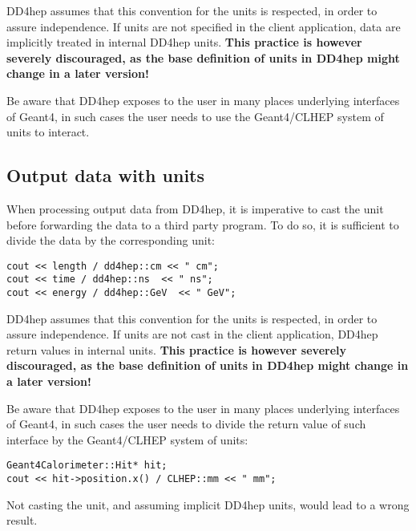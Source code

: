 DD4hep assumes that this convention for the units is respected, in order to assure independence. If units are not specified in the client application, data are implicitly treated in internal DD4hep units. \textbf{This practice is however severely discouraged, as the base definition of units in DD4hep might change in a later version!}

Be aware that DD4hep exposes to the user in many places underlying interfaces of Geant4, in such cases the user needs to use the Geant4/CLHEP system of units to interact.

\subsection{Output data with units}
When processing output data from DD4hep, it is imperative to cast the unit before forwarding the data to a third party program. To do so, it is sufficient to divide the data by the corresponding unit:
\begin{verbatim}
cout << length / dd4hep::cm << " cm";
cout << time / dd4hep::ns  << " ns";
cout << energy / dd4hep::GeV  << " GeV";
\end{verbatim}

DD4hep assumes that this convention for the units is respected, in order to assure independence. If units are not cast in the client application, DD4hep return values in internal units. \textbf{This practice is however severely discouraged, as the base definition of units in DD4hep might change in a later version!}

Be aware that DD4hep exposes to the user in many places underlying interfaces of Geant4, in such cases the user needs to divide the return value of such interface by the Geant4/CLHEP system of units:
\begin{verbatim}
Geant4Calorimeter::Hit* hit;
cout << hit->position.x() / CLHEP::mm << " mm";
\end{verbatim}
Not casting the unit, and assuming implicit DD4hep units, would lead to a wrong result.

